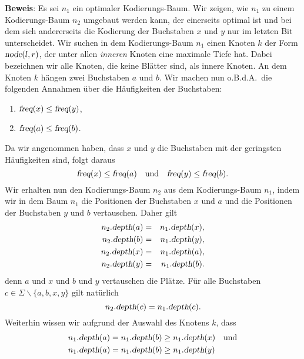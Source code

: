 \noindent
\textbf{Beweis}:  Es sei $n_1$ ein optimaler Kodierungs-Baum.  Wir zeigen, wie $n_1$ zu einem
Kodierungs-Baum $n_2$ umgebaut werden kann, der einerseits optimal ist und bei dem sich andererseits die
Kodierung der Buchstaben $x$ und $y$ nur im letzten Bit unterscheidet.  Wir suchen in dem Kodierungs-Baum
$n_1$ einen Knoten $k$ der Form $\textsl{node}(l,r)$, der unter allen \emph{inneren} Knoten eine maximale
Tiefe hat.  Dabei bezeichnen wir alle Knoten, die keine Bl\"atter sind, als innere Knoten.
An dem Knoten $k$ h\"angen zwei Buchstaben $a$ und $b$.  Wir machen nun o.B.d.A.~die folgenden Annahmen
\"uber die H\"aufigkeiten der Buchstaben:
\begin{enumerate}
\item $\textsl{freq}(x) \leq \textsl{freq}(y)$,
\item $\textsl{freq}(a) \leq \textsl{freq}(b)$.
\end{enumerate}
Da wir angenommen haben, dass $x$ und $y$ die Buchstaben mit der geringsten H\"aufigkeiten sind, folgt
daraus
\begin{equation}
  \label{eq:huffmannL0}
\textsl{freq}(x) \leq \textsl{freq}(a) \quad \textrm{und} \quad 
\textsl{freq}(y) \leq \textsl{freq}(b).  
\end{equation}
Wir erhalten nun den Kodierungs-Baum $n_2$ aus dem Kodierungs-Baum $n_1$, indem wir in dem Baum $n_1$ die
Positionen der Buchstaben $x$ und $a$ und die Positionen der Buchstaben $y$ und $b$ vertauschen.
Daher gilt 
  \begin{eqnarray}
    \label{eq:huffmannL1a}
 n_2.\textsl{depth}(a) &=& n_1.\textsl{depth}(x), \\
    \label{eq:huffmannL1b}
 n_2.\textsl{depth}(b) &=& n_1.\textsl{depth}(y), \\
    \label{eq:huffmannL1c}
 n_2.\textsl{depth}(x) &=& n_1.\textsl{depth}(a), \\
    \label{eq:huffmannL1d}
 n_2.\textsl{depth}(y) &=& n_1.\textsl{depth}(b).
  \end{eqnarray}
denn $a$ und $x$ und $b$ und $y$ vertauschen die Pl\"atze.  F\"ur alle Buchstaben
$c \in \Sigma\backslash\{a,b,x,y\}$ gilt nat\"urlich 
\begin{equation}
  \label{eq:huffmannL1e}
n_2.\textsl{depth}(c) = n_1.\textsl{depth}(c).   
\end{equation}
Weiterhin wissen wir aufgrund der Auswahl des Knotens $k$, dass
\begin{eqnarray}
  \label{eq:huffmannL2a}
  n_1.\textsl{depth}(a) = n_1.\textsl{depth}(b) \geq n_1.\textsl{depth}(x) \quad \mathrm{und} \\
  \label{eq:huffmannL2b}
  n_1.\textsl{depth}(a) = n_1.\textsl{depth}(b) \geq n_1.\textsl{depth}(y) \hspace*{0.95cm}
\end{eqnarray}
